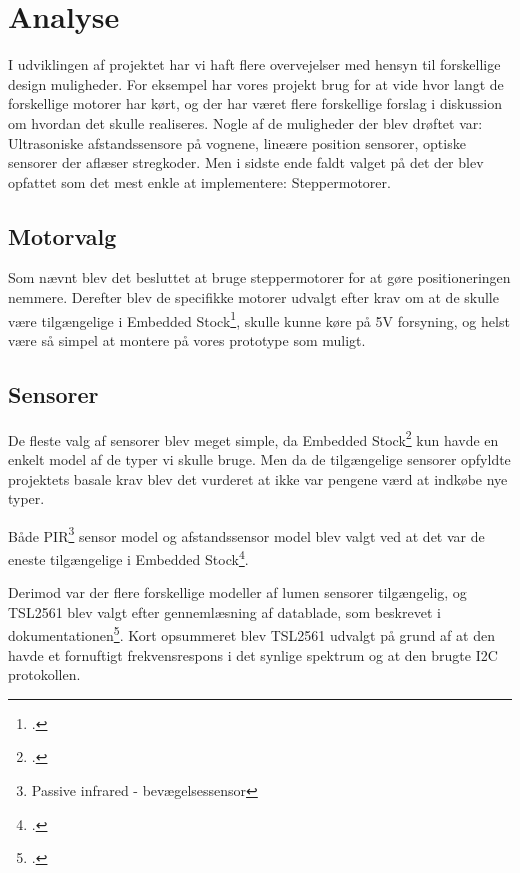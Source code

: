 \section{Analyse}

I udviklingen af projektet har vi haft flere overvejelser med hensyn til forskellige design muligheder. For eksempel har vores projekt brug for at vide hvor langt de forskellige motorer har kørt, og der har været flere forskellige forslag i diskussion om hvordan det skulle realiseres. Nogle af de muligheder der blev drøftet var: Ultrasoniske afstandssensore på vognene, lineære position sensorer, optiske sensorer der aflæser stregkoder. Men i sidste ende faldt valget på det der blev opfattet som det mest enkle at implementere: Steppermotorer.

\subsection{Motorvalg}

Som nævnt blev det besluttet at bruge steppermotorer for at gøre positioneringen nemmere. Derefter blev de specifikke motorer udvalgt efter krav om at de skulle være tilgængelige i Embedded Stock\footcite{embedded}, skulle kunne køre på 5V forsyning, og helst være så simpel at montere på vores prototype som muligt.

\subsection{Sensorer}

De fleste valg af sensorer blev meget simple, da Embedded Stock\footcite{embedded} kun havde en enkelt model af de typer vi skulle bruge. Men da de tilgængelige sensorer opfyldte projektets basale krav blev det vurderet at ikke var pengene værd at indkøbe nye typer.

Både PIR\footnote{Passive infrared - bevægelsessensor} sensor model og afstandssensor model blev valgt ved at det var de eneste tilgængelige i Embedded Stock\footcite{embedded}.

Derimod var der flere forskellige modeller af lumen sensorer tilgængelig, og TSL2561 blev valgt efter gennemlæsning af datablade, som beskrevet i dokumentationen\footcite{documentation}. Kort opsummeret blev TSL2561 udvalgt på grund af at den havde et fornuftigt frekvensrespons i det synlige spektrum og at den brugte I2C protokollen.